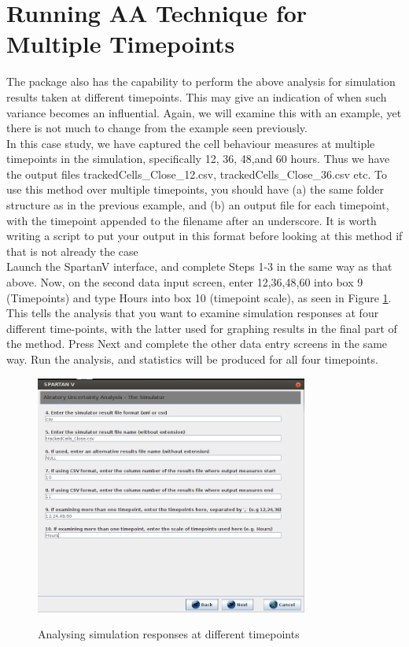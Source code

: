 \documentclass[a4paper,11pt]{article}
\begin{document}
\section{Running AA Technique for Multiple Timepoints}
\noindent The package also has the capability to perform the above analysis for simulation results taken at different timepoints. This may give an indication of when such variance becomes an influential.  Again, we will examine this with an example, yet there is not much to change from the example seen previously.
\\
In this case study, we have captured the cell behaviour measures at multiple timepoints in the simulation, specifically 12, 36, 48,and 60 hours.  Thus we have the output files trackedCells\_Close\_12.csv, trackedCells\_Close\_36.csv etc. To use this method over multiple timepoints, you should have (a) the same folder structure as in the previous example, and (b) an output file for each timepoint, with the timepoint appended to the filename after an underscore. It is worth writing a script to put your output in this format before looking at this method if that is not already the case
\\
Launch the SpartanV interface, and complete Steps 1-3 in the same way as that above. Now, on the second data input screen, enter 12,36,48,60 into box 9 (Timepoints) and type Hours into box 10 (timepoint scale), as seen in Figure \ref{AA_Screen5}. This tells the analysis that you want to examine simulation responses at four different time-points, with the latter used for graphing results in the final part of the method. Press Next and complete the other data entry screens in the same way. Run the analysis, and statistics will be produced for all four timepoints.

\begin{figure}
\centering
    \includegraphics[width=0.8\textwidth]{SpartanV_AA5.png}\\ \noindent
    \caption{Analysing simulation responses at different timepoints}
    \label{AA_Screen5}
    \newpage 
\end{figure}
\end{document}
